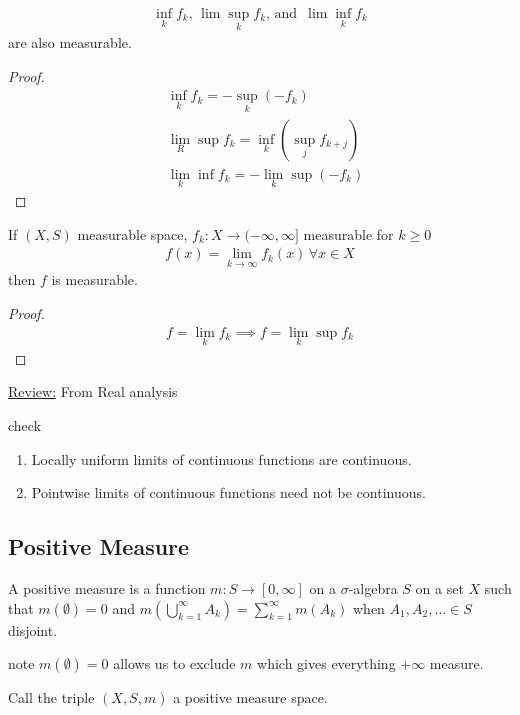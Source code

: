 \begin{corollary}
	\begin{align*}
		\inf_k f_k, \, \lim \sup_k f_k, \, \text{and } \, \lim \inf_k f_k
	\end{align*} are also measurable.
\end{corollary}

\begin{proof}
	\begin{align*}
		&\inf_k f_k = - \sup_{k} (-f_k) \\
		&\lim_{R} \sup f_k = \inf_{k} (\sup_{j} f_{k+j}) \\
		&\lim_{k}\inf f_k = - \lim_{k} \sup (-f_k)
	\end{align*}
\end{proof}

\begin{corollary}
	If $(X,S)$ measurable space, $f_k : X \to (-\infty, \infty]$ measurable for  $k \geq 0$
	 \begin{align*}
	    f (x) = \lim_{k \to  \infty} f_k (x) \, \forall x \in X
	\end{align*} then $f$ is measurable.
\end{corollary}

\begin{proof}
	 \begin{align*}
	f = \lim_{k} f_k \implies f = \lim_{k} \sup f_k
	\end{align*}
\end{proof}

\underline{Review:} From Real analysis

check
\begin{enumerate}
	\item Locally uniform limits of continuous functions are continuous.
	\item Pointwise limits of continuous functions need not be continuous.
\end{enumerate}

\subsection{Positive Measure}

\begin{definition}
	A positive measure is a function $m : S \to [0, \infty]$ on a $\sigma$-algebra $S$ on a set $X$ such that $m(\emptyset) = 0$
	and $m( \bigcup_{k=1}^{\infty} A_k) = \sum_{k=1}^{\infty} m(A_k)$ when
	$A_1, A_2, \ldots \in S$ disjoint.

	{\tiny note $m(\emptyset) = 0$ allows us to exclude $m$ which gives everything $+\infty$ measure.}

	Call the triple $(X,S,m)$ a positive measure space.
\end{definition}

